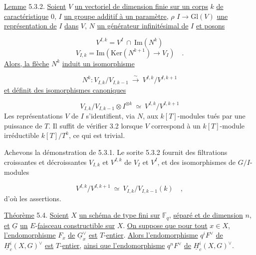 \underline{Lemme} 5.3.2. \underline{Soient} $V$ \underline{un vectoriel de dimension finie sur un corps} $k$ \underline{de caractéristique} $0$, $I$ \underline{un groupe additif à un paramètre}, $\rho$ $I \longrightarrow \mathrm{Gl}(V)$ \underline{une représentation de} $I$ \underline{dans} $V$, $N$ \underline{un générateur infinitésimal de} $I$ \underline{et posons}

\begin{equation*}
V^{I,k} = V^I \ \cap \ \mathrm{Im}(N^k)
\end{equation*}
\begin{equation*}
V_{I,k} = \mathrm{Im}(\mathrm{Ker}(N^{k+1}) \longrightarrow V_I) \quad .
\end{equation*}
\underline{Alors, la flèche} $N^k$ \underline{induit un isomorphisme}

\begin{equation*}
N^k : V_{I,k}/V_{I,k-1} \ \overset{\sim}{\longrightarrow} \ V^{I,k}/V^{I,k+1}
\end{equation*}
\underline{et définit des isomorphismes canoniques}

\begin{equation*}
V_{I,k}/V_{I,k-1} \otimes I^{\otimes k} \ \simeq \ V^{I,k}/V^{I,k+1}
\end{equation*}
Les représentations $V$ de $I$ s'identifient, via $N$, aux $k[T]$-modules tués par une puissance de $T$. Il suffit de vérifier 3.2 lorsque $V$ correspond à un $k[T]$-module irréductible $k[T]/T^k$, ce qui est trivial.

Achevons la démonstration de 5.3.1. Le sorite 5.3.2 fournit des filtrations croissantes et décroissantes $V_{I,k}$ et $V^{I,k}$ de $V_I$ et $V^I$, et des isomorphismes de $G/I$-modules

\begin{equation*}
V^{I,k}/V^{I,k+1} \ \simeq \ V_{I,k}/V_{I,k-1}(k) \quad ,
\end{equation*}
d'où les assertions.



\underline{Théorème} 5.4. \underline{Soient} $X$ \underline{un schéma de type fini sur} $\mathbb{F}_q$, \underline{séparé et de dimension} $n$, \underline{et} $\underline{G}$ \underline{un} $E$-\underline{faisceau constructible sur} $X$. \underline{On suppose que pour tout} $x \in X$, \underline{l'endomorphisme} $F_x$ \underline{de} $\underline{G}_x^\vee$ \underline{est} $T$-\underline{entier}. \underline{Alors l'endomorphisme} $q^i F^\vee$ \underline{de} $\underline{H}_c^i(X,G)^\vee$ \underline{est} $T$-\underline{entier}, \underline{ainsi que l'endomorphisme} $q^n F^\vee$ \underline{de} $\underline{H}_c^i(X,G)^\vee$.

